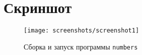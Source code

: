 \section{Скриншот}

\begin{figure}[H]
  \centering
  \texttt{[image: screenshots/screenshot1]}
  \caption{Сборка и запуск программы \texttt{numbers}}
\end{figure}
